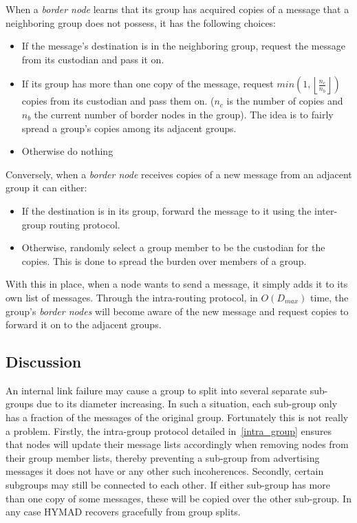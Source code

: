 \documentclass[10pt,twocolumn,letterpaper]{article}
\begin{document}
When a \textit{border node} learns that its group has acquired copies
of a message that a neighboring group does not possess, it has the
following choices:
\begin{itemize}
\item If the message's destination is in the neighboring group,
  request the message from its custodian and pass it on.
\item If its group has more than one copy of the message, request
  $min\left(1,\left\lfloor \frac{n_c}{n_b} \right\rfloor \right)$ copies from its
  custodian and pass them on.  ($n_c$ is the number of copies and
  $n_b$ the current number of border nodes in the group). The idea is
  to fairly spread a group's copies among its adjacent groups.
\item Otherwise do nothing
\end{itemize}

Conversely, when a \textit{border node} receives copies of a new
message from an adjacent group it can either:
\begin{itemize}
\item If the destination is in its group, forward the message to
  it using the inter-group routing protocol.
\item Otherwise, randomly select a group member to be the custodian
  for the copies. This is done to spread the burden over members of a
  group.
\end{itemize}

With this in place, when a node wants to send a message, it simply
adds it to its own list of messages. Through the intra-routing protocol,
in $O(D_{max})$ time, the group's \textit{border nodes} will become
aware of the new message and request copies to forward it on to the
adjacent groups.

\subsection{Discussion}
An internal link failure may cause a group to split into several
separate sub-groups due to its diameter increasing. In such a
situation, each sub-group only has a fraction of the messages of the
original group. Fortunately this is not really a problem. Firstly, the
intra-group protocol detailed in~\ref{intra_group} ensures that nodes
will update their message lists accordingly when removing nodes from
their group member lists, thereby preventing a sub-group from advertising
messages it does not have or any other such incoherences. Secondly,
certain subgroups may still be connected to each other. If either
sub-group has more than one copy of some messages, these will be
copied over the other sub-group. In any case HYMAD recovers gracefully
from group splits.
\end{document}
